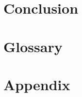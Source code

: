 \documentclass[letterpaper,10pt]{article}
\begin{document}
\section{Conclusion}

\section{Glossary}
\glsaddall
\printglossaries

\section{Appendix}

\end{document}
